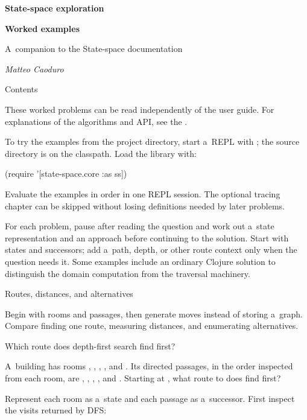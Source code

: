 \fontfam[LM]
\load[emoji]
\typosize[10/12]
\hyperlinks \Blue \Green

\centerline{\typosize[20/24]\bf State-space exploration}
\smallskip
\centerline{\typosize[14/18]\bf Worked examples}
\medskip
\centerline{A~companion to the State-space documentation}
\smallskip
\centerline{\it Matteo Caoduro}
\bigskip
\nonum\notoc
\sec Contents
\maketoc

These worked problems can be read independently of the user guide.
For explanations of the algorithms and API, see the
.

To try the examples from the project directory, start a~REPL with
; the source directory is on the classpath. Load the library
with:

\begtt {}
(require '[state-space.core :as ss])
\endtt

Evaluate the examples in order in one REPL session.
The optional tracing chapter can be skipped without losing definitions
needed by later problems.

For each problem, pause after reading the question and work out a~state
representation and an approach before continuing to the solution.
Start with states and successors; add a~path, depth, or other route context
only when the question needs it. Some examples include an ordinary Clojure
solution to distinguish the domain computation from the traversal machinery.

\sec Routes, distances, and alternatives

Begin with rooms and passages, then generate moves instead of storing a~graph.
Compare finding one route, measuring distances, and enumerating alternatives.

\secc Which route does depth-first search find first?

 A~building has rooms ,
, , , and . Its
directed passages, in the order inspected from each room, are
, ,
, , and
. Starting at , what route to
 does
find first?

\smallskip
{} Represent each room as a~state and each passage as
a~successor. First inspect the visits returned by DFS:

